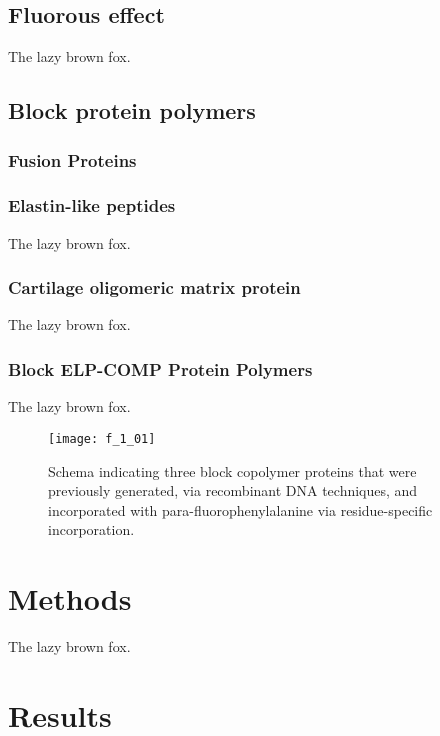 \subsection{Fluorous effect}

The lazy brown fox.

\subsection{Block protein polymers}

\subsubsection{Fusion Proteins}

\subsubsection{Elastin-like peptides}

The lazy brown fox.

\subsubsection{Cartilage oligomeric matrix protein}

The lazy brown fox.

\subsubsection{Block ELP-COMP Protein Polymers}

The lazy brown fox.

\begin{figure}[p]
    \centering
    \texttt{[image: f\_1\_01]}
    \caption{Schema indicating three block copolymer proteins that were
        previously generated, via recombinant DNA techniques, and incorporated
    with para-fluorophenylalanine via residue-specific incorporation.
    }
    \label{fig:pff_proteins}
\end{figure}


\section{Methods}

The lazy brown fox.

\section{Results}

